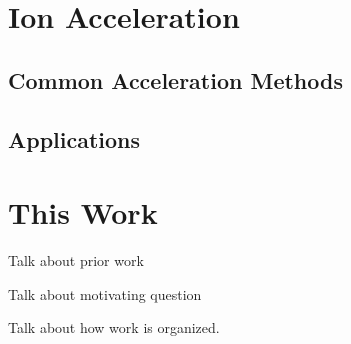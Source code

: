 \section{Ion Acceleration}

\subsection{Common Acceleration Methods}


\subsection{Applications}


\section{This Work}

Talk about prior work 


Talk about motivating question 


Talk about how work is organized. 


